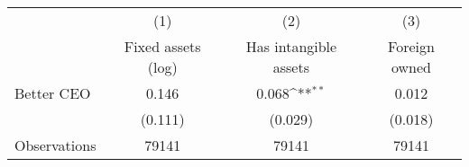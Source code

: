 {
\def\sym#1{\ifmmode^{#1}\else\(^{#1}\)\fi}
\begin{tabular}{l*{3}{c}}
\hline\hline
                    &\multicolumn{1}{c}{(1)}&\multicolumn{1}{c}{(2)}&\multicolumn{1}{c}{(3)}\\
                    &\multicolumn{1}{c}{Fixed assets (log)}&\multicolumn{1}{c}{Has intangible assets}&\multicolumn{1}{c}{Foreign owned}\\
\hline
Better CEO          &       0.146         &       0.068\sym{**} &       0.012         \\
                    &     (0.111)         &     (0.029)         &     (0.018)         \\
\hline
Observations        &       79141         &       79141         &       79141         \\
\hline\hline
\end{tabular}
}
